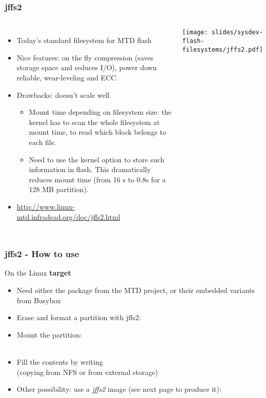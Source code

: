 \begin{frame}
  \frametitle{jffs2}
  \begin{columns}
    \begin{itemize}
    \item Today's standard filesystem for MTD flash
    \item Nice features: on the fly compression (saves storage space
      and reduces I/O), power down reliable, wear-leveling and ECC.
    \item Drawbacks: doesn't scale well
      \begin{itemize}
      \item Mount time depending on filesystem size: the kernel has to
        scan the whole filesystem at mount time, to read which block
        belongs to each file.
      \item Need to use the  kernel option
        to store such information in flash. This dramatically reduces
        mount time (from 16 s to 0.8s for a 128 MB partition).
      \end{itemize}
    \item \url{http://www.linux-mtd.infradead.org/doc/jffs2.html}
    \end{itemize}
    \texttt{[image: slides/sysdev-flash-filesystems/jffs2.pdf]}
  \end{columns}
\end{frame}

\begin{frame}
  \frametitle{jffs2 - How to use}
  On the Linux {\bf target}
  \begin{itemize}
  \item Need either the  package from the MTD project,
    or their embedded variants from Busybox
  \item Erase and format a partition with jffs2:\\
  \item Mount the partition:\\
    \\
  \item Fill the contents by writing\\
    (copying from NFS or from external storage)
  \item Other possibility: use a {\em jffs2} image (see next page to
    produce it):\\
    \\
  \end{itemize}
\end{frame}

